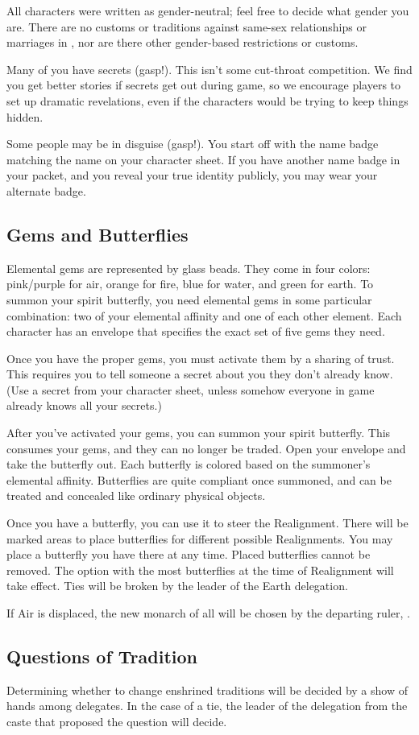 \documentclass[sheet]{iron}
\begin{document}
All characters were written as gender-neutral; feel free to decide
what gender you are.  There are no customs or traditions against
same-sex relationships or marriages in \sHomeCountry{}, nor are
there other gender-based restrictions or customs.

Many of you have secrets (gasp!).  This isn't some cut-throat
competition.  We find you get better stories if secrets get out during
game, so we encourage players to set up dramatic revelations, even if
the characters would be trying to keep things hidden.

Some people may be in disguise (gasp!).  You start off with the name
badge matching the name on your character sheet.  If you have another
name badge in your packet, and you reveal your true identity publicly, you may
wear your alternate badge.

\subsection{Gems and Butterflies}

Elemental gems are represented by glass beads.  They come in
four colors: pink/purple for air, orange for fire, blue for water, and green
for earth.  To summon your spirit butterfly, you need
elemental gems in some particular combination: two of
your elemental affinity and one of each other element.
Each character has an envelope that specifies the exact set of
five gems they need.

Once you have the proper gems, you must activate them by
a sharing of trust.  This requires you to tell someone a secret about
you they don't already know.  (Use a secret from your character
sheet, unless somehow everyone in game already knows all your secrets.)

After you've activated your gems, you can summon your spirit
butterfly.  This consumes your gems, and they can no longer be traded.
Open your envelope and take the butterfly out.  Each butterfly is
colored based on the summoner's elemental affinity.  Butterflies are
quite compliant once summoned, and can be treated and concealed like
ordinary physical objects.

Once you have a butterfly, you can use it to steer the Realignment.
There will be marked areas to place butterflies for different possible
Realignments.  You may place a butterfly you have there at any time.
Placed butterflies cannot be removed.  The option
with the most butterflies at the time of Realignment will take effect.
Ties will be broken by the leader of the Earth delegation.

If Air is displaced, the new monarch of all \sHomeCountry{} will be
chosen by the departing ruler, \cRoyalty{}.

\subsection{Questions of Tradition}

Determining whether to change enshrined traditions will be decided by
a show of hands among delegates.  In the case of a tie, the leader
of the delegation from the caste that proposed the question will
decide.
\end{document}

